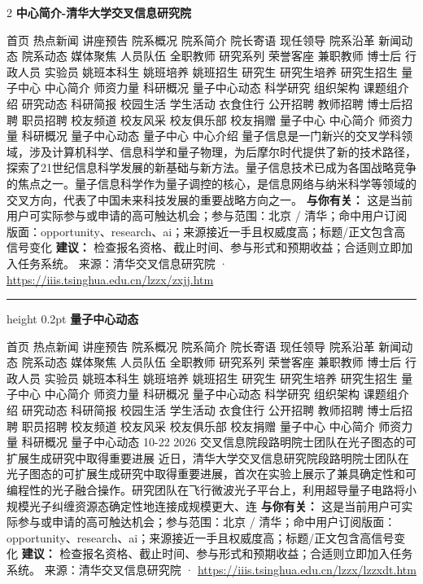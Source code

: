 \documentclass[10.5pt]{ctexart}
\begin{document}
\begin{multicols}{2}
{\large\bfseries 中心简介-清华大学交叉信息研究院}\par
首页 热点新闻 讲座预告 院系概况 院系简介 院长寄语 现任领导 院系沿革 新闻动态 院系动态 媒体聚焦 人员队伍 全职教师 研究系列 荣誉客座 兼职教师 博士后 行政人员 实验员 姚班本科生 姚班培养 姚班招生 研究生 研究生培养 研究生招生 量子中心 中心简介 师资力量 科研概况 量子中心动态 科学研究 组织架构 课题组介绍 研究动态 科研简报 校园生活 学生活动 衣食住行 公开招聘 教师招聘 博士后招聘 职员招聘 校友频道 校友风采 校友俱乐部 校友捐赠 量子中心 中心简介 师资力量 科研概况 量子中心动态 量子中心 中心介绍 量子信息是一门新兴的交叉学科领域，涉及计算机科学、信息科学和量子物理，为后摩尔时代提供了新的技术路径，探索了21世纪信息科学发展的新基础与新方法。量子信息技术已成为各国战略竞争的焦点之一。量子信息科学作为量子调控的核心，是信息网络与纳米科学等领域的交叉方向，代表了中国未来科技发展的重要战略方向之一。
\textbf{与你有关：} 这是当前用户可实际参与或申请的高可触达机会；参与范围：北京 / 清华；命中用户订阅版面：opportunity、research、ai；来源接近一手且权威度高；标题/正文包含高信号变化
\textbf{建议：} 检查报名资格、截止时间、参与形式和预期收益；合适则立即加入任务系统。
{\footnotesize\color{ormuted} 来源：清华交叉信息研究院 · \url{https://iiis.tsinghua.edu.cn/lzzx/zxjj.htm}}
\vspace{2mm}
\hrule height 0.2pt
\vspace{2mm}
{\large\bfseries 量子中心动态}\par
首页 热点新闻 讲座预告 院系概况 院系简介 院长寄语 现任领导 院系沿革 新闻动态 院系动态 媒体聚焦 人员队伍 全职教师 研究系列 荣誉客座 兼职教师 博士后 行政人员 实验员 姚班本科生 姚班培养 姚班招生 研究生 研究生培养 研究生招生 量子中心 中心简介 师资力量 科研概况 量子中心动态 科学研究 组织架构 课题组介绍 研究动态 科研简报 校园生活 学生活动 衣食住行 公开招聘 教师招聘 博士后招聘 职员招聘 校友频道 校友风采 校友俱乐部 校友捐赠 量子中心 中心简介 师资力量 科研概况 量子中心动态 10-22 2026 交叉信息院段路明院士团队在光子图态的可扩展生成研究中取得重要进展 近日，清华大学交叉信息研究院段路明院士团队在光子图态的可扩展生成研究中取得重要进展，首次在实验上展示了兼具确定性和可编程性的光子融合操作。研究团队在飞行微波光子平台上，利用超导量子电路将小规模光子纠缠资源态确定性地连接成规模更大、连
\textbf{与你有关：} 这是当前用户可实际参与或申请的高可触达机会；参与范围：北京 / 清华；命中用户订阅版面：opportunity、research、ai；来源接近一手且权威度高；标题/正文包含高信号变化
\textbf{建议：} 检查报名资格、截止时间、参与形式和预期收益；合适则立即加入任务系统。
{\footnotesize\color{ormuted} 来源：清华交叉信息研究院 · \url{https://iiis.tsinghua.edu.cn/lzzx/lzzxdt.htm}}

\end{multicols}
\end{document}
